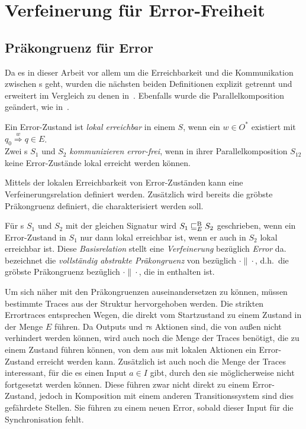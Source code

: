 \chapter{Verfeinerung für Error-Freiheit}

\section{Präkongruenz für Error}

Da es in dieser Arbeit vor allem um die Erreichbarkeit und die Kommunikation
zwischen \EIO{}s geht, wurden die nächsten beiden Definitionen explizit
getrennt und erweitert im Vergleich zu denen in~\cite{Vogler2014EIO}. Ebenfalls
wurde die Parallelkomposition geändert, wie in~\cite{Schlosser2012BA}.

\begin{Def}
  Ein Error-Zustand ist \emph{lokal erreichbar} in einem \EIO{} $S$, wenn ein
  $w\in O^*$ existiert mit $q_0 \overset{w}{\Rightarrow} q\in E$.\\
  Zwei \EIO{}s $S_1$ und $S_2$ \emph{kommunizieren error-frei}, wenn in ihrer
  Parallelkomposition $S_{12}$ keine Error-Zustände lokal erreicht werden können.
\end{Def}

Mittels der lokalen Erreichbarkeit von Error-Zuständen kann eine
Verfeinerungsrelation definiert werden. Zusätzlich wird bereits die
gröbste Präkongruenz definiert, die charakterisiert werden soll.

\begin{Def}
\label{DefErrorBasisrel}
  Für \EIO{}s $S_1$ und $S_2$ mit der gleichen Signatur wird
  $S_1\sqsubseteq _E^\mathrm{B} S_2$ geschrieben, wenn ein Error-Zustand in $S_1$ nur dann lokal erreichbar ist, wenn er
  auch in $S_2$ lokal erreichbar ist. Diese \emph{Basisrelation} stellt eine
  \emph{Verfeinerung} bezüglich \emph{Error} da.\\
  \ECRel{} bezeichnet die \emph{vollständig abstrakte Präkongruenz} von \EBRel{}
  bezüglich $\cdot\|\cdot$, d.h.\ die gröbste Präkongruenz bezüglich
  $\cdot\|\cdot$, die in \EBRel{} enthalten ist.
\end{Def}

Um sich näher mit den Präkongruenzen auseinandersetzen zu können, müssen bestimmte Traces
aus der Struktur hervorgehoben werden. Die strikten Errortraces entsprechen Wegen, die
direkt vom Startzustand zu einem Zustand in der Menge $E$ führen. Da Outputs
und $\tau$s Aktionen
sind, die von außen nicht verhindert werden können, wird auch noch die
Menge der Traces benötigt, die zu einem Zustand führen können, von dem aus mit lokalen Aktionen
ein Error-Zustand erreicht werden kann. Zusätzlich ist auch noch die Menge der Traces
interessant, für die es einen Input $a\in I$ gibt, durch den sie möglicherweise nicht
fortgesetzt werden können. Diese führen zwar nicht direkt zu einem
Error-Zustand,
jedoch in Komposition mit einem anderen Transitionssystem sind
dies gefährdete Stellen. Sie führen zu einem neuen Error, sobald dieser Input
für die Synchronisation fehlt.

